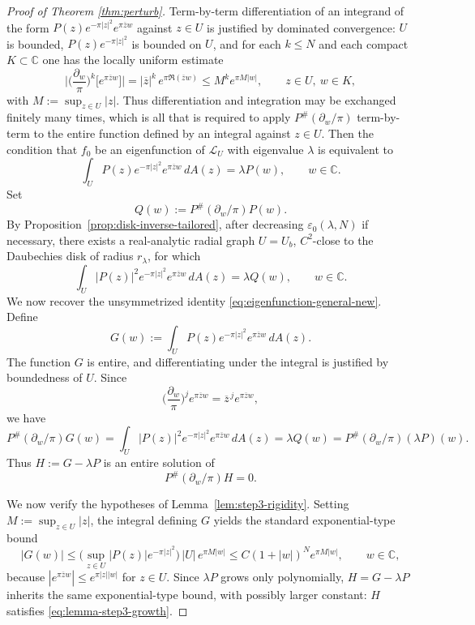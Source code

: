 \documentclass[a4paper,11pt,reqno]{amsart}
\numberwithin{equation}{section}
\theoremstyle{plain} %
\theoremstyle{definition} %
\theoremstyle{remark}
\newcommand{\C}{\mathbb{C}}
\begin{document}
\begin{proof}[Proof of Theorem \ref{thm:perturb}]
Term-by-term differentiation of an integrand of the form
\(P(z)e^{-\pi|z|^2}e^{\pi\overline z w}\) against \(z\in U\) is justified by
dominated convergence: \(U\) is bounded, \(P(z)e^{-\pi|z|^2}\) is bounded on
\(U\), and for each \(k\le N\) and each compact \(K\subset\C\) one has the
locally uniform estimate
\[
\Big|\Big(\frac{\partial_w}{\pi}\Big)^k\!\big[e^{\pi\overline z w}\big]\Big|
=
|\overline z|^k\,e^{\pi\Re(\overline z w)}
\le
M^k e^{\pi M|w|},
\qquad z\in U,\ w\in K,
\]
with \(M:=\sup_{z\in U}|z|\). Thus differentiation and integration may be
exchanged finitely many times, which is all that is required to apply
\(P^\#(\partial_w/\pi)\) term-by-term to the entire function defined by an
integral against \(z\in U\). Then the condition that $f_0$ be an eigenfunction
of $\mathcal{L}_U$ with eigenvalue $\lambda$ is equivalent to
\begin{equation}\label{eq:eigenfunction-general-new}
\int_U P(z)e^{-\pi|z|^2}e^{\pi \overline z w}\,dA(z)=\lambda P(w),
\qquad w\in \C.
\end{equation}
Set
\begin{equation}\label{eq:Q-def}
Q(w):=P^\#(\partial_w/\pi)P(w).
\end{equation}
By Proposition~\ref{prop:disk-inverse-tailored}, after decreasing
\(\varepsilon_0(\lambda,N)\) if necessary, there exists a real-analytic radial
graph \(U=U_b\), \(C^2\)-close to the Daubechies disk of radius
\(r_\lambda\), for which
\begin{equation}\label{eq:almost-reduced-new}
\int_U |P(z)|^2e^{-\pi|z|^2}e^{\pi\overline z w}\,dA(z)
=
\lambda Q(w),
\qquad w\in\C .
\end{equation}
We now recover the unsymmetrized identity
\eqref{eq:eigenfunction-general-new}. Define
\[
G(w):=\int_U P(z)e^{-\pi|z|^2}e^{\pi\overline z w}\,dA(z).
\]
The function \(G\) is entire, and differentiating under the integral is
justified by boundedness of \(U\). Since
\[
\Big(\frac{\partial_w}{\pi}\Big)^j e^{\pi\overline z w}
=\overline z^{\,j}e^{\pi\overline z w},
\]
we have
\[
P^\#(\partial_w/\pi)G(w)
=
\int_U |P(z)|^2e^{-\pi|z|^2}e^{\pi\overline z w}\,dA(z)
=
\lambda Q(w)
=
P^\#(\partial_w/\pi)(\lambda P)(w).
\]
Thus \(H:=G-\lambda P\) is an entire solution of
\[
P^\#(\partial_w/\pi)H=0.
\]

We now verify the hypotheses of Lemma~\ref{lem:step3-rigidity}. Setting
\(M:=\sup_{z\in U}|z|\), the integral defining \(G\) yields the standard
exponential-type bound
\begin{equation}\label{eq:G-growth-bound}
|G(w)|\le\Big(\sup_{z\in U}|P(z)|e^{-\pi|z|^2}\Big)\,|U|\,e^{\pi M|w|}
\le C(1+|w|)^N e^{\pi M|w|},
\qquad w\in\C,
\end{equation}
because \(|e^{\pi\overline z w}|\le e^{\pi|z||w|}\) for \(z\in U\). Since
\(\lambda P\) grows only polynomially, \(H=G-\lambda P\) inherits the same
exponential-type bound, with possibly larger constant: \(H\) satisfies
\eqref{eq:lemma-step3-growth}.


\end{proof}
\end{document}
